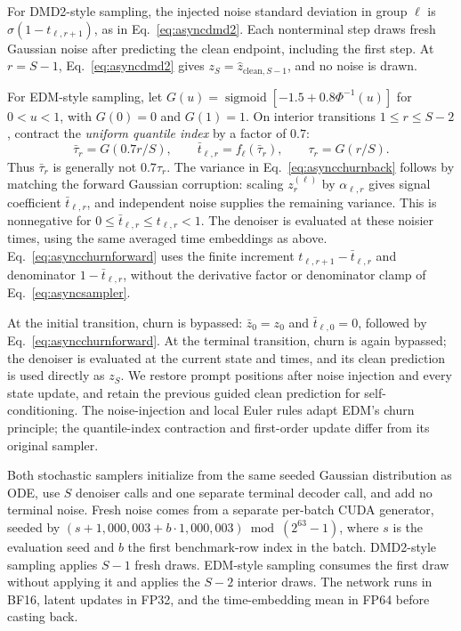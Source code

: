\documentclass[11pt,letterpaper]{article}
\begin{document}
For DMD2-style sampling, the injected noise standard deviation in group $\ell$ is $\sigma(1-t_{\ell,r+1})$, as in Eq.~\eqref{eq:asyncdmd2}. Each nonterminal step draws fresh Gaussian noise after predicting the clean endpoint, including the first step. At $r=S-1$, Eq.~\eqref{eq:asyncdmd2} gives $z_S=\widehat z_{\mathrm{clean},S-1}$, and no noise is drawn.

For EDM-style sampling, let $G(u)=\operatorname{sigmoid}[-1.5+0.8\Phi^{-1}(u)]$ for $0<u<1$, with $G(0)=0$ and $G(1)=1$. On interior transitions $1\leq r\leq S-2$, contract the \emph{uniform quantile index} by a factor of $0.7$:
\begin{equation}
 \bar\tau_r=G(0.7r/S),\qquad
 \bar t_{\ell,r}=f_\ell(\bar\tau_r),\qquad
 \tau_r=G(r/S).
 \label{eq:indexchurnclock}
\end{equation}
Thus $\bar\tau_r$ is generally not $0.7\tau_r$. The variance in Eq.~\eqref{eq:asyncchurnback} follows by matching the forward Gaussian corruption: scaling $z_r^{(\ell)}$ by $\alpha_{\ell,r}$ gives signal coefficient $\bar t_{\ell,r}$, and independent noise supplies the remaining variance. This is nonnegative for $0\leq\bar t_{\ell,r}\leq t_{\ell,r}<1$. The denoiser is evaluated at these noisier times, using the same averaged time embeddings as above. Eq.~\eqref{eq:asyncchurnforward} uses the finite increment $t_{\ell,r+1}-\bar t_{\ell,r}$ and denominator $1-\bar t_{\ell,r}$, without the derivative factor or denominator clamp of Eq.~\eqref{eq:asyncsampler}.

At the initial transition, churn is bypassed: $\bar z_0=z_0$ and $\bar t_{\ell,0}=0$, followed by Eq.~\eqref{eq:asyncchurnforward}. At the terminal transition, churn is again bypassed; the denoiser is evaluated at the current state and times, and its clean prediction is used directly as $z_S$. We restore prompt positions after noise injection and every state update, and retain the previous guided clean prediction for self-conditioning. The noise-injection and local Euler rules adapt EDM's churn principle; the quantile-index contraction and first-order update differ from its original sampler.

Both stochastic samplers initialize from the same seeded Gaussian distribution as ODE, use $S$ denoiser calls and one separate terminal decoder call, and add no terminal noise. Fresh noise comes from a separate per-batch CUDA generator, seeded by $(s+1{,}000{,}003+b\cdot1{,}000{,}003)\bmod(2^{63}-1)$, where $s$ is the evaluation seed and $b$ the first benchmark-row index in the batch. DMD2-style sampling applies $S-1$ fresh draws. EDM-style sampling consumes the first draw without applying it and applies the $S-2$ interior draws. The network runs in BF16, latent updates in FP32, and the time-embedding mean in FP64 before casting back.
\end{document}
